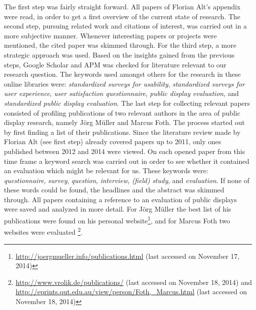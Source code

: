 	The first step was fairly straight forward. All papers of Florian Alt's appendix were read, in order to get a first overview of the current state of research. 
	The second step, pursuing related work and citations of interest, was carried out in a more subjective manner. Whenever interesting papers or projects were mentioned, the cited paper was skimmed through. 
	For the third step, a more strategic approach was used. Based on the insights gained from the previous steps, Google Scholar and APM was checked for literature relevant to our research question. The keywords used amongst others for the research in these online libraries were: \textit{standardized surveys for usability}, \textit{standardized surveys for user experience}, \textit{user satisfaction questionnaire}, \textit{public display evaluation}, and \textit{standardized public display evaluation}.
	The last step for collecting relevant papers consisted of profiling publications of two relevant authors in the area of public display research, namely J\"org M\"uller and Marcus Foth. The process started out by first finding a list of their publications. Since the literature review made by Florian Alt (see first step) already covered papers up to 2011, only ones published between 2012 and 2014 were viewed. 
	On each opened paper from this time frame a keyword search was carried out in order to see whether it contained an evaluation which might be relevant for us. These keywords were: \textit{questionnaire}, \textit{survey}, \textit{question}, \textit{interview}, \textit{(field) study}, and \textit{evaluation}. If none of these words could be found, the headlines and the abstract was skimmed through. All papers containing a reference to an evaluation of public displays were saved and analyzed in more detail.
	For J\"org M\"uller the best list of his publications were found on his personal website\footnote{\url{http://joergmueller.info/publications.html} (last accessed on November 17, 2014)}, and for Marcus Foth two websites were evaluated \footnote{\url{http://www.vrolik.de/publications/} (last accessed on November 18, 2014) and \url{http://eprints.qut.edu.au/view/person/Foth,_Marcus.html} (last accessed on November 18, 2014)}. 






